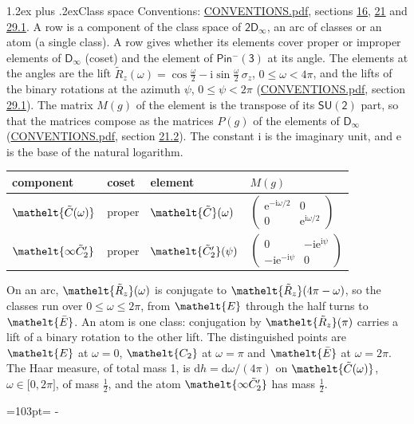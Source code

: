 \documentclass[10pt,a4paper]{article}
\makeatletter
\renewcommand\section{\@startsection{section}{1}{\z@}{-3ex plus -1ex minus -.2ex}%
  {1.2ex plus .2ex}{\normalfont\large\sffamily\bfseries\color{parttitle}}}
\newcommand{\needspace}[1]{\par\penalty-100\begingroup\dimen0=#1\relax\dimen2=\pagegoal
  \advance\dimen2-\pagetotal\ifdim\dimen0>\dimen2\relax\ifdim\dimen2>0pt\vfil\break\fi\fi
  \endgroup}
\numberwithin{equation}{section}
\newcommand{\eltfont}[1]{{\let\sigma\eltsigma\mathelt{#1}}}
\newcommand{\grp}[1]{\mathsf{#1}}
\newcommand{\cls}[1]{\eltfont{#1}}
\newcommand{\comp}[1]{\eltfont{#1}}
\newcommand{\elt}[1]{\eltfont{#1}}
\newcommand{\iunit}{\mathrm{i}}
\newcommand{\expe}{\mathrm{e}}
\newcommand{\diff}{\mathrm{d}}
\newcommand{\barred}[1]{\bar{#1}}
\newcommand{\lift}[1]{\tilde{#1}}
\newcommand{\pauli}[1]{\sigma_{#1}}
\makeatother
\begin{document}
\section{Class space}\label{s:class_space}
Conventions: \href{../../CONVENTIONS.pdf}{CONVENTIONS.pdf}, sections \href{../../../rotation/CONVENTIONS.pdf\#conv.16}{16}, \href{../../CONVENTIONS.pdf\#conv.21}{21} and \href{../../CONVENTIONS.pdf\#conv.29.1}{29.1}.
\leavevmode\label{n:head.component}A row is a component of the class space of $\grp{2D_{\infty }}$, an arc of classes or an atom (a single class). \label{n:head.coset}\label{n:head.element}A row gives whether its elements cover proper or improper elements of \href{../../../rotation/data/pdf/Dinf.pdf}{$\grp{D_{\infty}}$} (coset) and the element of $\grp{Pin^{-}(3)}$ at its angle. \label{n:angle.omega}\label{n:angle.psi}The elements at the angles are the lift $\lift{R}_z(\omega) = \cos\tfrac{\omega}{2} - \iunit\sin\tfrac{\omega}{2}\,\pauli{z}$, $0 \le \omega < 4\pi$, and the lifts of the binary rotations at the azimuth $\psi$, $0 \le \psi < 2\pi$ (\href{../../CONVENTIONS.pdf}{CONVENTIONS.pdf}, section \href{../../CONVENTIONS.pdf\#conv.29.1}{29.1}). \label{n:matrix.element.pin}The matrix $M(g)$ of the element is the transpose of its $\grp{SU(2)}$ part, so that the matrices compose as the matrices $P(g)$ of the elements of \href{../../../rotation/data/pdf/Dinf.pdf}{$\grp{D_{\infty}}$} (\href{../../CONVENTIONS.pdf}{CONVENTIONS.pdf}, section \href{../../CONVENTIONS.pdf\#conv.21.2}{21.2}).
The constant $\iunit$ is the imaginary unit, and $\expe$ is the base of the natural logarithm.
\begin{center}\begin{tabular}{@{}llll@{}}\toprule
component & coset & element & $M(g)$\\\midrule
$\comp{\lift{C}(\omega)}$ & proper & $\elt{\lift{C}}(\omega)$ & $\left(\begin{smallmatrix}\expe^{-\iunit\omega/2} & 0\\ 0 & \expe^{\iunit\omega/2}\end{smallmatrix}\right)$\\\addlinespace[6pt]
$\comp{\infty\lift{C}_2'}$ & proper & $\elt{\lift{C}_2'}(\psi)$ & $\left(\begin{smallmatrix}0 & -\iunit\expe^{\iunit\psi}\\ -\iunit\expe^{-\iunit\psi} & 0\end{smallmatrix}\right)$\\
\bottomrule\end{tabular}\end{center}
On an arc, $\elt{\lift{R}_z}(\omega)$ is conjugate to $\elt{\lift{R}_z}(4\pi - \omega)$, so the classes run over $0 \le \omega \le 2\pi$, from $\cls{E}$ through the half turns to $\cls{\barred{E}}$. An atom is one class: conjugation by $\elt{\lift{R}_z}(\pi)$ carries a lift of a binary rotation to the other lift.
The distinguished points are $\cls{E}$ at $\omega = 0$, $\cls{C_2}$ at $\omega = \pi$ and $\cls{\barred{E}}$ at $\omega = 2\pi$.
\leavevmode\label{n:local.haar.h}The Haar measure, of total mass 1, is $\diff h = \diff\omega/(4\pi)$ on $\comp{\lift{C}(\omega)}$, $\omega\in\bigl[0, 2\pi\bigr]$, of mass $\tfrac{1}{2}$, and the atom $\comp{\infty\lift{C}_2'}$ has mass $\tfrac{1}{2}$.
\needspace{103pt}
\end{document}
